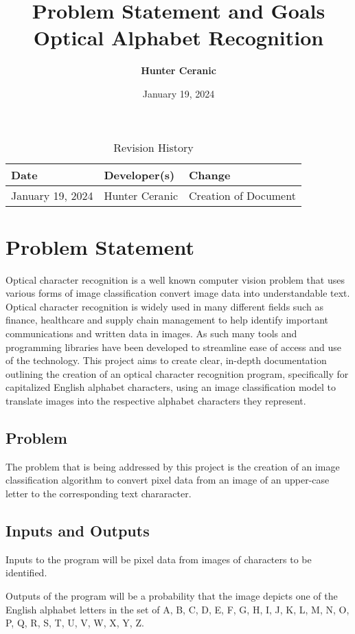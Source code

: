 \documentclass{article}
\title{Problem Statement and Goals\\Optical Alphabet Recognition}
\author{\textbf{Hunter Ceranic}}
\date{January 19, 2024}
\begin{document}
\maketitle

\begin{table}[hp]
\caption{Revision History} \label{TblRevisionHistory}
\begin{tabularx}{\textwidth}{llX}
\toprule
\textbf{Date} & \textbf{Developer(s)} & \textbf{Change}\\
\midrule
January 19, 2024 & Hunter Ceranic & Creation of Document\\
\bottomrule
\end{tabularx}
\end{table}

\section{Problem Statement}
Optical character recognition is a well known computer vision problem that uses various forms of image classification 
convert image data into understandable text. Optical character recognition is widely used in many different fields such as 
finance, healthcare and supply chain management to help identify important communications and written data in images. 
As such many tools and programming libraries have been developed to streamline ease of access and use of the technology. 
This project aims to create clear, in-depth documentation outlining the creation of an optical character recognition program,
specifically for capitalized English alphabet characters, using an image classification model to translate images into the 
respective alphabet characters they represent.

\subsection{Problem}
The problem that is being addressed by this project is the creation of an image classification algorithm to convert 
pixel data from an image of an upper-case letter to the corresponding text chararacter.
\subsection{Inputs and Outputs}
Inputs to the program will be pixel data from images of characters to be identified.

Outputs of the program will be a probability that the image depicts one of the English alphabet letters in the 
set of {A, B, C, D, E, F, G, H, I, J, K, L, M, N, O, P, Q, R, S, T, U, V, W, X, Y, Z}.
\end{document}
